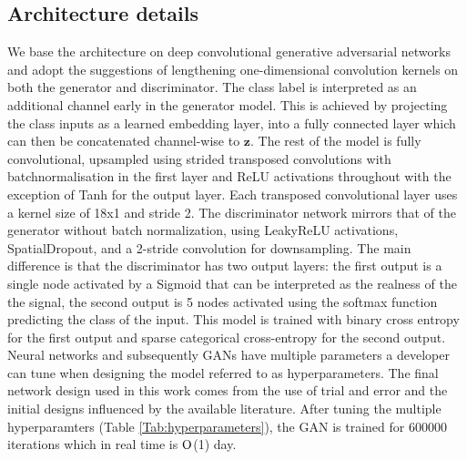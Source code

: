 \documentclass[12pt]{iopart}
\begin{document}
\subsection{Architecture details}
We base the architecture on deep convolutional generative adversarial networks \cite{Radford2015} and adopt the suggestions of \cite{DBLP:journals/corr/abs-1809-11096} lengthening one-dimensional convolution kernels on both the generator and discriminator. The class label is interpreted as an additional channel early in the generator model. This is achieved by projecting the class inputs as a learned embedding layer, into a fully connected layer which can then be concatenated channel-wise to $\textbf{z}$. The rest of the model is fully convolutional, upsampled using strided transposed convolutions with batchnormalisation in the first layer and ReLU activations throughout with the exception of Tanh for the output layer. Each transposed convolutional layer uses a kernel size of 18x1 and stride 2.
The discriminator network mirrors that of the generator without batch normalization, using LeakyReLU activations, SpatialDropout, and a 2-stride convolution for downsampling. The main difference is that the discriminator has two output layers: the first output is a single node activated by a Sigmoid that can be interpreted as the realness of the the signal, the second output is 5 nodes activated using the softmax function predicting the class of the input. This model is trained with binary cross entropy for the first output and sparse categorical cross-entropy for the second output.
Neural networks and subsequently GANs have multiple parameters a developer can tune when designing the model referred to as hyperparameters. The final network design used in this work comes from the use of trial and error and the initial designs influenced by the available literature. After tuning the multiple hyperparamters (Table \ref{Tab:hyperparameters}), the GAN is trained for 600000 iterations which in real time is $\mathord{\mathrm{O}}$(1) day.

\end{document}
